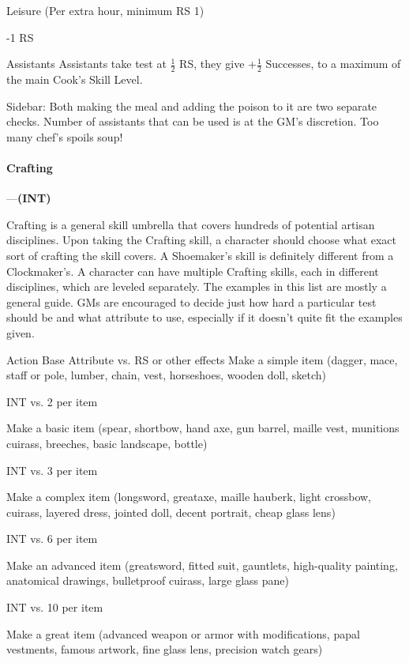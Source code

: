 \documentclass[oneside,11pt,english]{book}
\begin{document}
Leisure (Per extra hour, 
minimum RS 1) 

-1 RS 

Assistants Assistants take test at $ \frac{1}{2} $ RS, they give +$ \frac{1}{2} $ Successes, to a maximum 
of the main Cook’s Skill Level. 

 
Sidebar: 
Both making the meal and adding the poison to it are two separate checks. 
Number of assistants that can be used is at the GM’s discretion. Too many chef’s spoils soup! 

 

\paragraph{\label{skill:Crafting}Crafting}---\quad\textbf{(INT) }\par
Crafting is a general skill umbrella that covers hundreds of potential artisan disciplines. Upon taking the Crafting skill, a character should choose what exact sort of crafting the skill covers. A Shoemaker’s skill is definitely different from a Clockmaker’s. A character can have multiple Crafting skills, each in different disciplines, which are leveled separately. The examples in this list are mostly a general guide. GMs are encouraged to decide just how hard a particular test should be and what attribute to use, especially if it doesn’t quite fit the examples given. 


Action Base Attribute vs. RS or other effects 
Make a simple item (dagger, mace, staff or pole, 
lumber, chain, vest, horseshoes, wooden doll, sketch) 

INT vs. 2 per item 

Make a basic item (spear, shortbow, hand axe, gun 
barrel, maille vest, munitions cuirass, breeches, basic 
landscape, bottle) 

INT vs. 3 per item 

Make a complex item (longsword, greataxe, maille 
hauberk, light crossbow, cuirass, layered dress, 
jointed doll, decent portrait, cheap glass lens) 

INT vs. 6 per item 

Make an advanced item (greatsword, fitted suit, 
gauntlets, high-quality painting, anatomical drawings, 
bulletproof cuirass, large glass pane) 

INT vs. 10 per item 

Make a great item (advanced weapon or armor with 
modifications, papal vestments, famous artwork, fine 
glass lens, precision watch gears) 
\end{document}
